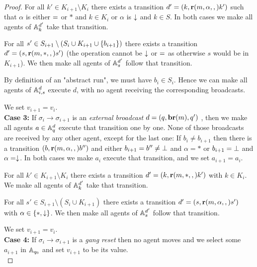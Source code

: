 \begin{proof}
For all $k' \in K_{i+1} \setminus K_i $ there exists a transition $d'=(k, \textbf{r}(m, \alpha, ,) k')$ such that $\alpha$ is either ${=}$ or $*$ and $k \in K_i$ or $\alpha$ is $\downarrow$ and $k\in S$.
In both cases we make all agents of $\mathbb{A}_k^{d'}$ take that transition.

For all $s' \in S_{i+1} \setminus (S_i \cup K_{i+1} \cup \{b_{i+1}\})$ there exists a transition $d'=(s,\textbf{r}(m, *, ,)s')$ (the operation cannot be $\downarrow$ or ${=}$ as otherwise $s$ would be in $K_{i+1}$). We then make all agents of $\mathbb{A}_s^{d'}$ follow that transition. 

By definition of an "abstract run", we must have $b_i \in S_i$.
Hence we can make all agents of $\mathbb{A}_{i,s}^{d}$ execute $d$, with no agent receiving the corresponding broadcasts.

We set $v_{i+1} = v_i$.
\\

\textbf{Case 3: } If $\sigma_i \to \sigma_{i+1}$ is an \emph{external broadcast} $d = (q, \textbf{br}(m), q')$ , then we make all agents $a \in \mathbb{A}_q^{d}$ execute that transition one by one. None of those broadcasts are received by any other agent, except for the last one:
If $b_i \neq b_{i+1}$ then there is a transition $(b, \textbf{r}(m, \alpha, ,) b'')$ and either $b_{i+1} = b'' \neq \bot$ and $\alpha = *$ or $b_{i+1} = \bot$ and $\alpha=\downarrow$. In both cases we make $a_i$ execute that transition, and we set $a_{i+1} = a_i$.

For all $k' \in K_{i+1} \setminus K_i$ there exists a transition $d'=(k, \textbf{r}(m, *, ,) k')$ with $k \in K_i$. We make all agents of $\mathbb{A}_k^{d'}$ take that transition.

For all $s' \in S_{i+1} \setminus (S_i \cup K_{i+1})$ there exists a transition $d'=(s,\textbf{r}(m, \alpha, ,)s')$ with $\alpha \in \{*, \downarrow\}$. We then make all agents of $\mathbb{A}_s^{d'}$ follow that transition. 

We set $v_{i+1} = v_i$.
\\

\textbf{Case 4: }  If $\sigma_i \to \sigma_{i+1}$ is a \emph{gang reset} then no agent moves and we select some $a_{i+1}$ in $\mathbb{A}_{q_0}$ and set $v_{i+1}$ to be its value.
\\


\end{proof}
